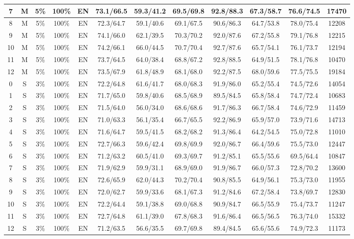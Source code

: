 \begin{table*}
{\begin{tabular}{|c|c|c|c|c||c|c|c|c|c|c||c|}
7 & M & 5\% & 100\% & EN & 73.1/66.5 & 59.3/41.2 & 69.5/69.8 & 92.8/88.3 & 67.3/58.7 & 76.6/74.5 & 17470 \\ \hline
8 & M & 5\% & 100\% & EN & 72.3/64.7 & 59.1/40.6 & 69.1/67.5 & 90.6/86.3 & 64.7/53.8 & 78.0/75.4 & 12208 \\ \hline
9 & M & 5\% & 100\% & EN & 74.1/66.0 & 62.1/39.5 & 70.3/70.2 & 92.0/87.6 & 67.2/55.8 & 79.1/76.8 & 12215 \\ \hline
10 & M & 5\% & 100\% & EN & 74.2/66.1 & 66.0/44.5 & 70.7/70.4 & 92.7/87.6 & 65.7/54.1 & 76.1/73.7 & 12194 \\ \hline
11 & M & 5\% & 100\% & EN & 73.7/64.5 & 64.0/38.4 & 68.8/67.2 & 92.8/88.5 & 64.9/51.5 & 78.1/76.8 & 10470 \\ \hline
12 & M & 5\% & 100\% & EN & 73.5/67.9 & 61.8/48.9 & 68.1/68.0 & 92.2/87.5 & 68.0/59.6 & 77.5/75.5 & 19184 \\ \hline
0 & S & 3\% & 100\% & EN & 72.2/64.8 & 61.6/41.7 & 68.0/68.3 & 91.9/86.0 & 65.2/55.4 & 74.5/72.6 & 14054 \\ \hline
1 & S & 3\% & 100\% & EN & 71.7/65.0 & 59.8/40.6 & 68.5/68.9 & 89.5/84.5 & 65.8/58.4 & 74.7/72.4 & 10683 \\ \hline
2 & S & 3\% & 100\% & EN & 71.5/64.0 & 56.0/34.0 & 68.6/68.6 & 91.7/86.3 & 66.7/58.4 & 74.6/72.9 & 11459 \\ \hline
3 & S & 3\% & 100\% & EN & 71.0/63.3 & 56.1/35.4 & 66.7/65.5 & 92.2/86.9 & 65.9/57.0 & 73.9/71.6 & 14713 \\ \hline
4 & S & 3\% & 100\% & EN & 71.6/64.7 & 59.5/41.5 & 68.2/68.2 & 91.3/86.4 & 64.2/54.5 & 75.0/72.8 & 11010 \\ \hline
5 & S & 3\% & 100\% & EN & 72.7/66.3 & 59.6/42.4 & 69.8/69.9 & 92.0/86.7 & 66.4/59.6 & 75.5/73.0 & 12447 \\ \hline
6 & S & 3\% & 100\% & EN & 71.2/63.2 & 60.5/41.0 & 69.3/69.7 & 91.2/85.1 & 65.5/55.6 & 69.5/64.4 & 10847 \\ \hline
7 & S & 3\% & 100\% & EN & 71.9/62.9 & 59.9/31.1 & 68.9/69.0 & 91.9/86.7 & 66.0/57.3 & 72.8/70.2 & 13600 \\ \hline
8 & S & 3\% & 100\% & EN & 72.6/65.9 & 62.0/44.3 & 70.2/70.4 & 90.8/85.5 & 64.9/56.1 & 75.3/73.0 & 11955 \\ \hline
9 & S & 3\% & 100\% & EN & 72.0/62.7 & 59.9/33.6 & 68.1/67.3 & 91.2/84.6 & 67.2/58.4 & 73.8/69.7 & 12830 \\ \hline
10 & S & 3\% & 100\% & EN & 72.2/64.4 & 59.1/38.8 & 69.0/68.8 & 90.9/84.7 & 66.5/55.9 & 75.4/73.7 & 11247 \\ \hline
11 & S & 3\% & 100\% & EN & 72.7/64.8 & 61.1/39.0 & 67.8/68.3 & 91.6/86.4 & 66.5/56.5 & 76.3/74.0 & 15332 \\ \hline
12 & S & 3\% & 100\% & EN & 71.2/63.5 & 56.6/35.5 & 69.7/69.8 & 89.4/84.5 & 65.6/55.6 & 74.9/72.3 & 11173 \\ \hline
\end{tabular}}
\end{table*}

